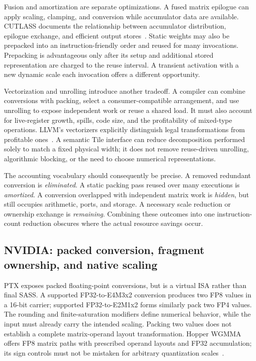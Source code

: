 Fusion and amortization are separate optimizations. A fused matrix epilogue can apply scaling, clamping, and conversion while accumulator data are available. CUTLASS documents the relationship between accumulator distribution, epilogue exchange, and efficient output stores~\citep{u003_cutlass_gemm}. Static weights may also be prepacked into an instruction-friendly order and reused for many invocations. Prepacking is advantageous only after its setup and additional stored representation are charged to the reuse interval. A transient activation with a new dynamic scale each invocation offers a different opportunity.

Vectorization and unrolling introduce another tradeoff. A compiler can combine conversions with packing, select a consumer-compatible arrangement, and use unrolling to expose independent work or reuse a shared load. It must also account for live-register growth, spills, code size, and the profitability of mixed-type operations. LLVM's vectorizers explicitly distinguish legal transformations from profitable ones~\citep{u003_llvm_vectorizers}. A semantic Tile interface can reduce decomposition performed solely to match a fixed physical width; it does not remove reuse-driven unrolling, algorithmic blocking, or the need to choose numerical representations.

The accounting vocabulary should consequently be precise. A removed redundant conversion is \emph{eliminated}. A static packing pass reused over many executions is \emph{amortized}. A conversion overlapped with independent matrix work is \emph{hidden}, but still occupies arithmetic, ports, and storage. A necessary scale reduction or ownership exchange is \emph{remaining}. Combining these outcomes into one instruction-count reduction obscures where the actual resource savings occur.

\subsection{NVIDIA: packed conversion, fragment ownership, and native scaling}

PTX exposes packed floating-point conversions, but is a virtual ISA rather than final SASS. A supported FP32-to-E4M3x2 conversion produces two FP8 values in a 16-bit carrier; supported FP32-to-E2M1x2 forms similarly pack two FP4 values. The rounding and finite-saturation modifiers define numerical behavior, while the input must already carry the intended scaling. Packing two values does not establish a complete matrix-operand layout transformation. Hopper WGMMA offers FP8 matrix paths with prescribed operand layouts and FP32 accumulation; its sign controls must not be mistaken for arbitrary quantization scales~\citep{u003_ptx}.

